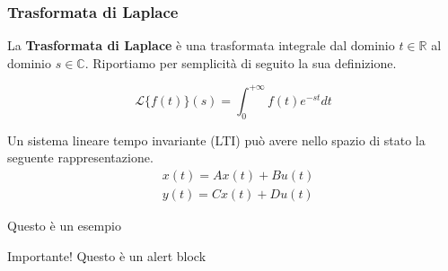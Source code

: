 \documentclass[aspectratio=169]{beamer}
\begin{document}
    \begin{frame}
        \frametitle{Trasformata di Laplace}
        La \textbf{Trasformata di Laplace} è una trasformata integrale dal dominio $t\in\mathbb{R}$ al dominio $s\in\mathbb{C}$. Riportiamo per semplicità di seguito la sua definizione.

        \begin{equation}
            \mathcal{L}\{f(t)\}(s) = \int_{0}^{+\infty} {f(t) e^{-st}} dt 
        \end{equation}

        \begin{definition}
            Un sistema lineare tempo invariante (LTI) può avere nello spazio di stato la seguente rappresentazione. 
            \begin{equation}
                \begin{aligned}
                    &x(t)=Ax(t)+Bu(t)\\
                    &y(t)=Cx(t)+Du(t)
                \end{aligned}
            \end{equation}
        \end{definition}

        \begin{example}
            Questo è un esempio
        \end{example}
    \end{frame}

    \begin{frame}
        \begin{alertblock}{Importante!}
            Questo è un alert block
        \end{alertblock}
    \end{frame}
\end{document}
